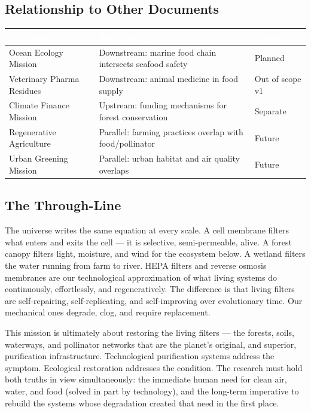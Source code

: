 \documentclass[11pt,letterpaper]{article}
\newcommand{\tableheader}[1]{\textbf{\sffamily\textcolor{white}{#1}}}
\begin{document}
\subsection{Relationship to Other Documents}

\begin{center}
\begin{tabularx}{\textwidth}{L{4cm}XC{2.5cm}}
\toprule
{}
\tableheader{Document} & \tableheader{Relationship} & \tableheader{Status} \\
\midrule
Ocean Ecology Mission & Downstream: marine food chain intersects seafood safety & Planned \\
Veterinary Pharma Residues & Downstream: animal medicine in food supply & Out of scope v1 \\
Climate Finance Mission & Upstream: funding mechanisms for forest conservation & Separate \\
Regenerative Agriculture & Parallel: farming practices overlap with food/pollinator & Future \\
Urban Greening Mission & Parallel: urban habitat and air quality overlaps & Future \\
\bottomrule
\end{tabularx}
\end{center}

\subsection{The Through-Line}

The universe writes the same equation at every scale. A cell membrane filters what enters and exits the cell --- it is selective, semi-permeable, alive. A forest canopy filters light, moisture, and wind for the ecosystem below. A wetland filters the water running from farm to river. HEPA filters and reverse osmosis membranes are our technological approximation of what living systems do continuously, effortlessly, and regeneratively. The difference is that living filters are self-repairing, self-replicating, and self-improving over evolutionary time. Our mechanical ones degrade, clog, and require replacement.

This mission is ultimately about restoring the living filters --- the forests, soils, waterways, and pollinator networks that are the planet's original, and superior, purification infrastructure. Technological purification systems address the symptom. Ecological restoration addresses the condition. The research must hold both truths in view simultaneously: the immediate human need for clean air, water, and food (solved in part by technology), and the long-term imperative to rebuild the systems whose degradation created that need in the first place.
\end{document}
